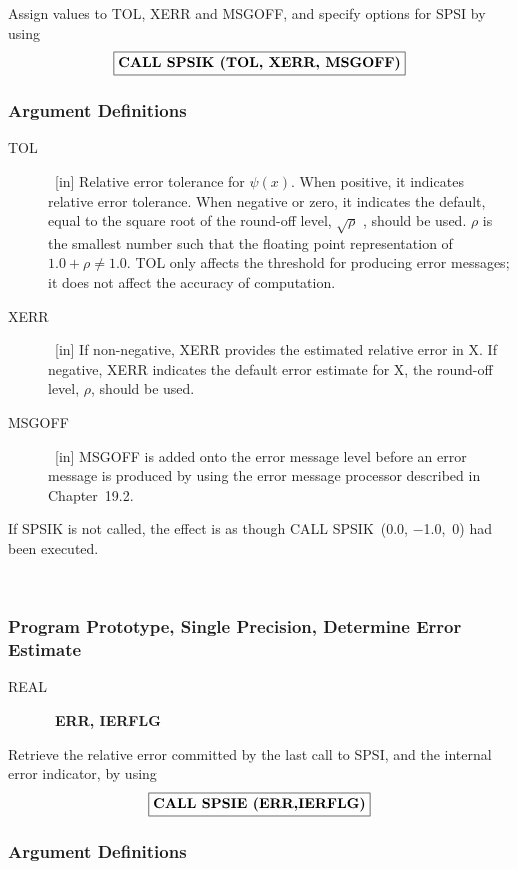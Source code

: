 \documentclass[twoside]{MATH77}
\begin{document}
Assign values to TOL, XERR and MSGOFF, and specify options for SPSI by using
$$
\fbox{{\bf CALL SPSIK (TOL, XERR, MSGOFF)}}
$$

\subsubsection{Argument Definitions}

\begin{description}
\item[TOL]  \ [in] Relative error tolerance for $\psi (x)$. When positive,
it indicates relative error tolerance. When negative or zero, it indicates
the default, equal to the square root of the round-off level, $\sqrt{\rho }$%
, should be used. $\rho $ is the smallest number such that the floating
point representation of $1.0+\rho \neq 1.0$. TOL only affects the threshold
for producing error messages; it does not affect the accuracy of computation.

\item[XERR]  \ [in] If non-negative, XERR provides the estimated relative
error in X. If negative, XERR indicates the default error estimate for X,
the round-off level, $\rho $, should be used.

\item[MSGOFF]  \ [in] MSGOFF is added onto the error message level before an
error message is produced by using the error message processor described in
Chapter~19.2.
\end{description}

If SPSIK is not called, the effect is as though CALL SPSIK~(0.0, $-$1.0,~0)
had been executed.
\vspace{10pt}

\hspace{5pt}\mbox{ }

\subsubsection{Program Prototype, Single Precision, Determine Error Estimate}

\begin{description}
\item[REAL]  \ {\bf ERR, IERFLG}
\end{description}

Retrieve the relative error committed by the last call to SPSI, and the
internal error indicator, by using
$$
\fbox{{\bf CALL SPSIE (ERR,IERFLG)}}
$$

\subsubsection{Argument Definitions}
\end{document}
